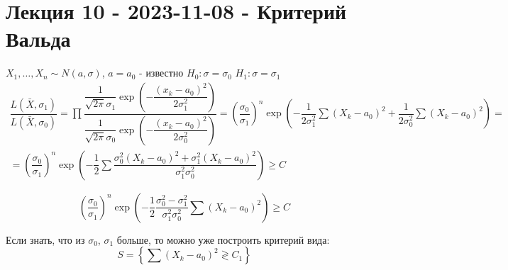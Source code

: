 \section{Лекция 10 - 2023-11-08 - Критерий Вальда}




  

\begin{ex}
  $X_1,\dots,X_n \sim N(a, \sigma)$, $a = a_0$ - известно
  $H_0 : \sigma = \sigma_0$
  $H_1 : \sigma = \sigma_1$
  \begin{multline*}
    \dfrac{L(\bar X, \sigma_1)}{L(\bar X, \sigma_0)}
    = \prod \dfrac{\dfrac{1}{\sqrt{2\pi} \sigma_1} \exp\left(- \dfrac{(x_k -
    a_0)^2}{2\sigma_1^2}\right)}{\dfrac{1}{\sqrt{2\pi} \sigma_0} \exp\left(- \dfrac{(x_k - a_0)^2}{2\sigma_0^2}\right)}
    = \left(\dfrac{\sigma_0}{\sigma_1}\right)^n \exp\left(-\dfrac{1}{2\sigma_1^2} \sum (X_k-a_0)^2 + \dfrac{1}{2\sigma_0^2} \sum (X_k-a_0)^2 \right) = \\
    = \left(\dfrac{\sigma_0}{\sigma_1}\right)^n \exp\left( -\dfrac{1}{2} \sum \dfrac{\sigma_0^2 (X_k-a_0)^2 + \sigma_1^2 (X_k - a_0)^2}{\sigma_1^2 \sigma_0^2} \right) \geqslant C
  \end{multline*}

  \begin{equation*}
    \left(\dfrac{\sigma_0}{\sigma_1}\right)^n \exp\left(-\dfrac{1}{2} \dfrac{\sigma_0^2 - \sigma_1^2}{\sigma_1^2 \sigma_0^2} \sum (X_k-a_0)^2\right) \geqslant C
  \end{equation*}

  Если знать, что из $ \sigma_0 $, $ \sigma_1 $ больше, то можно уже построить критерий вида:
  $$ S = \left\{ \sum(X_k-a_0)^2 \gtrless C_1 \right\} $$
\end{ex}

